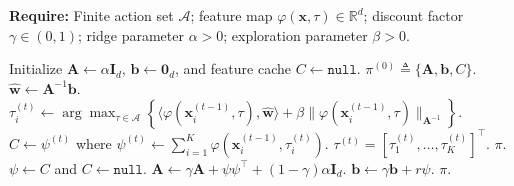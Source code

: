 \begin{algorithm}[t]
\caption{(Contextual case; per-client) Discounted LinUCB}
\label{alg:dlinucb}
\textbf{Require:} Finite action set $\mathcal A$; feature map $\varphi(\boldsymbol{x},\tau)\in\mathbb R^d$; discount factor $\gamma\in(0,1)$; ridge parameter $\alpha>0$; exploration parameter $\beta>0$.
\begin{algorithmic}[1]
    \State Initialize $\boldsymbol{A}\gets \alpha \boldsymbol{I}_d$, $\boldsymbol{b}\gets \boldsymbol{0}_d$, and feature cache $C\gets \texttt{null}$.
    \State \Return $\pi^{(0)} \triangleq \{\boldsymbol{A},\boldsymbol{b},C\}$.
\EndProcedure
{}
    \State $\hat{\boldsymbol{w}} \gets \boldsymbol{A}^{-1}\boldsymbol{b}$.
        \State $\tau_i^{(t)} \gets \arg\max_{\tau\in\mathcal A}\left\{\langle \varphi(\boldsymbol{x}_i^{(t-1)},\tau),\hat{\boldsymbol{w}}\rangle
        + \beta \big\|\varphi(\boldsymbol{x}_i^{(t-1)},\tau)\big\|_{\boldsymbol{A}^{-1}}\right\}$.
    \EndFor
    \State $C \gets \psi^{(t)}$ where $\psi^{(t)} \gets \sum_{i=1}^K \varphi(\boldsymbol{x}_i^{(t-1)},\tau_i^{(t)})$.
    \State \Return $\tau^{(t)} = [\tau_1^{(t)},\ldots,\tau_K^{(t)}]^\top$.
\EndProcedure
{}
     \State \Return $\pi$. \EndIf
    \State $\psi \gets C$ and $C\gets \texttt{null}$.
    \State $\boldsymbol{A} \gets \gamma \boldsymbol{A} + \psi\psi^\top + (1-\gamma)\alpha \boldsymbol{I}_d$.
    \State $\boldsymbol{b} \gets \gamma \boldsymbol{b} + r\psi$.
    \State \Return $\pi$.
\EndProcedure
\end{algorithmic}
\end{algorithm}